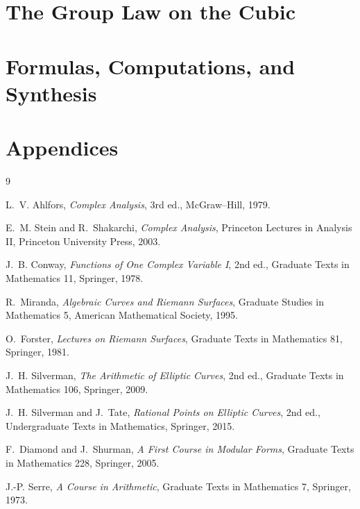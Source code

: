 \documentclass[11pt]{book}
\begin{document}
\part{The Group Law on the Cubic}





\part{Formulas, Computations, and Synthesis}





\appendix
\part{Appendices}





\backmatter

\begin{thebibliography}{9}

L.~V. Ahlfors, \emph{Complex Analysis}, 3rd ed., McGraw--Hill, 1979.

E.~M. Stein and R.~Shakarchi, \emph{Complex Analysis}, Princeton Lectures in
Analysis II, Princeton University Press, 2003.

J.~B. Conway, \emph{Functions of One Complex Variable I}, 2nd ed., Graduate Texts
in Mathematics 11, Springer, 1978.

R.~Miranda, \emph{Algebraic Curves and Riemann Surfaces}, Graduate Studies in
Mathematics 5, American Mathematical Society, 1995.

O.~Forster, \emph{Lectures on Riemann Surfaces}, Graduate Texts in Mathematics 81,
Springer, 1981.

J.~H. Silverman, \emph{The Arithmetic of Elliptic Curves}, 2nd ed., Graduate Texts
in Mathematics 106, Springer, 2009.

J.~H. Silverman and J.~Tate, \emph{Rational Points on Elliptic Curves}, 2nd ed.,
Undergraduate Texts in Mathematics, Springer, 2015.

F.~Diamond and J.~Shurman, \emph{A First Course in Modular Forms}, Graduate Texts
in Mathematics 228, Springer, 2005.

J.-P. Serre, \emph{A Course in Arithmetic}, Graduate Texts in Mathematics 7,
Springer, 1973.

\end{thebibliography}
\end{document}
